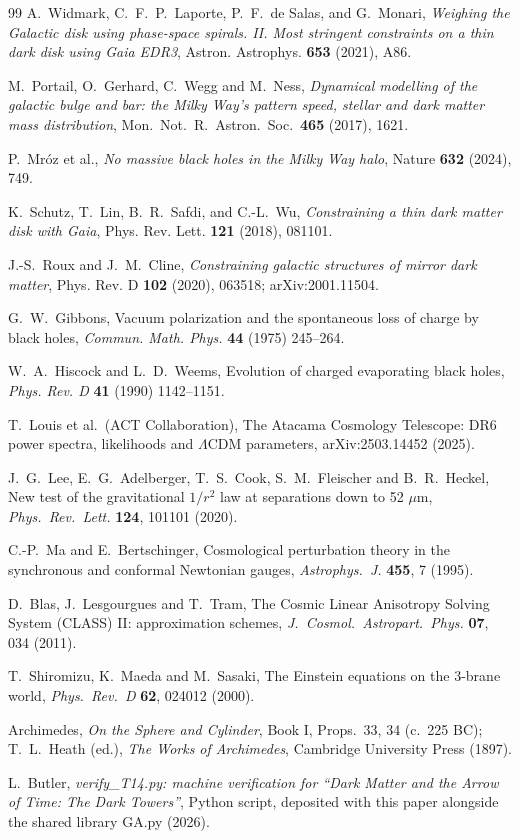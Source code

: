 \documentclass[11pt]{article}
\theoremstyle{definition}
\begin{document}
\begin{thebibliography}{99}
A.~Widmark, C.~F.~P.~Laporte, P.~F.~de Salas, and G.~Monari,
\emph{Weighing the Galactic disk using phase-space spirals. II. Most stringent constraints on a thin dark disk using Gaia EDR3},
Astron. Astrophys. \textbf{653} (2021), A86.

M.~Portail, O.~Gerhard, C.~Wegg and M.~Ness,
\emph{Dynamical modelling of the galactic bulge and bar: the Milky Way's pattern speed, stellar and dark matter mass distribution},
Mon.\ Not.\ R.\ Astron.\ Soc.\ \textbf{465} (2017), 1621.

P.~Mr\'oz et al.,
\emph{No massive black holes in the Milky Way halo},
Nature \textbf{632} (2024), 749.

K.~Schutz, T.~Lin, B.~R.~Safdi, and C.-L.~Wu,
\emph{Constraining a thin dark matter disk with Gaia},
Phys. Rev. Lett. \textbf{121} (2018), 081101.

J.-S.~Roux and J.~M.~Cline,
\emph{Constraining galactic structures of mirror dark matter},
Phys. Rev. D \textbf{102} (2020), 063518; arXiv:2001.11504.

G.~W.~Gibbons,
Vacuum polarization and the spontaneous loss of charge by black holes,
\emph{Commun. Math. Phys.} \textbf{44} (1975) 245--264.

W.~A.~Hiscock and L.~D.~Weems,
Evolution of charged evaporating black holes,
\emph{Phys. Rev. D} \textbf{41} (1990) 1142--1151.

T.~Louis et al.\ (ACT Collaboration),
The Atacama Cosmology Telescope: DR6 power spectra, likelihoods and $\Lambda$CDM parameters,
arXiv:2503.14452 (2025).

J.~G.~Lee, E.~G.~Adelberger, T.~S.~Cook, S.~M.~Fleischer and B.~R.~Heckel,
New test of the gravitational $1/r^{2}$ law at separations down to 52 $\mu$m,
\emph{Phys.\ Rev.\ Lett.} \textbf{124}, 101101 (2020).

C.-P.~Ma and E.~Bertschinger,
Cosmological perturbation theory in the synchronous and conformal Newtonian gauges,
\emph{Astrophys.\ J.} \textbf{455}, 7 (1995).

D.~Blas, J.~Lesgourgues and T.~Tram,
The Cosmic Linear Anisotropy Solving System (CLASS) II: approximation schemes,
\emph{J.\ Cosmol.\ Astropart.\ Phys.} \textbf{07}, 034 (2011).

T.~Shiromizu, K.~Maeda and M.~Sasaki,
The Einstein equations on the 3-brane world,
\emph{Phys.\ Rev.\ D} \textbf{62}, 024012 (2000).

Archimedes, \emph{On the Sphere and Cylinder}, Book I, Props.~33, 34 (c.~225 BC); T.~L.~Heath (ed.), \emph{The Works of Archimedes}, Cambridge University Press (1897).

L.~Butler,
\emph{verify\_T14.py: machine verification for ``Dark Matter and the Arrow of Time: The Dark Towers''},
Python script, deposited with this paper alongside the shared library GA.py (2026).

\end{thebibliography}
\end{document}
